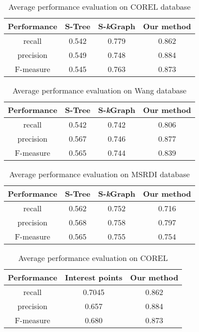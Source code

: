 \documentclass{amcs}
\begin{document}
\begin{table}[!b]
 \centering
 \caption{Average performance evaluation on COREL database}
 \label{table1}
 \begin{tabular}{|c|c|c|c|}
   \hline
   Performance & S-Tree & S-\textit{k}Graph & Our method\\\hline\hline
   recall 		& 0.542 & 0.779 & 0.862 \\
   precision 	& 0.549 & 0.748 & 0.884 \\
   F-measure 	& 0.545 & 0.763 & 0.873 \\\hline
 \end{tabular}
\end{table}

\begin{table}[!b]
 \centering
 \caption{Average performance evaluation on Wang database}
 \label{table2}
 \begin{tabular}{|c|c|c|c|}
   \hline
   Performance & S-Tree & S-\textit{k}Graph & Our method\\\hline\hline
   recall 		& 0.542 & 0.742 & 0.806 \\
   precision 	& 0.567 & 0.746 & 0.877 \\
   F-measure 	& 0.565 & 0.744 & 0.839 \\\hline
 \end{tabular}
\end{table}

\begin{table}[!b]
 \centering
 \caption{Average performance evaluation on MSRDI database}
 \label{table3}
 \begin{tabular}{|c|c|c|c|}
   \hline
   Performance & S-Tree & S-\textit{k}Graph & Our method\\\hline\hline
   recall 		& 0.562 & 0.752 & 0.716 \\
   precision 	& 0.568 & 0.758 & 0.797 \\
   F-measure 	& 0.565 & 0.755 & 0.754 \\\hline
 \end{tabular}
\end{table}


\begin{table}[!b]
 \centering
 \caption{Average performance evaluation on COREL}
 \label{table4}
 \begin{tabular}{|c|c|c|}
   \hline
   Performance & Interest points  & Our method\\\hline\hline
   recall 		& 0.7045 & 0.862 \\
   precision 	& 0.657 & 0.884 \\
   F-measure 	& 0.680 & 0.873 \\\hline
 \end{tabular}
\end{table}
\end{document}
